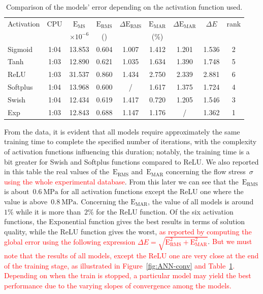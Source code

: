 \documentclass[algorithms,article,submit,pdftex,oneauthors]{Definitions/mdpi}
\DeclareRobustCommand{\MSE}{\text{E}_\text{MS}}
\DeclareRobustCommand{\RMSE}{\text{E}_\text{RMS}}
\DeclareRobustCommand{\MARE}{\text{E}_\text{MAR}}
\DeclareRobustCommand{\MPa}{\text{MPa}}
\begin{document}
\begin{table}[h!]
\caption{Comparison of the models' error depending on the activation function used.\label{tab:Training}}
\begin{tabular}{l|c|c|cc|cc|cc}
\toprule
Activation & CPU & $\MSE$ & $\RMSE$ & $\Delta\RMSE$ & $\MARE$ & $\Delta\MARE$ &  $\Delta E$ & rank \\
 & & $\times 10^{-6}$ & (\MPa) & & (\%) & & &\\ \midrule
Sigmoid & 1:04 & 13.853 & 0.604 & 1.007 & 1.412 & 1.201 & 1.536 & 2\\
Tanh & 1:03 & 12.890 & 0.621 & 1.035 & 1.634 & 1.390 & 1.748 & 5\\
ReLU & 1:03 & 31.537 & 0.860 & 1.434 & 2.750 & 2.339 & 2.881 & 6\\
Softplus & 1:04 & 13.968 & 0.600 & / & 1.617 & 1.375 & 1.724 & 4\\
Swish & 1:04 & 12.434 & 0.619 & 1.417 & 0.720 & 1.205 & 1.546 & 3\\
Exp & 1:03 & 12.843 & 0.688 & 1.147 & 1.176 & / & 1.362 & 1\\
\bottomrule
\end{tabular}
\end{table}

\textcolor{greencolor}{From the data, it is evident that all models require approximately the same training time to complete the specified number of iterations, with the complexity of activation functions influencing this duration; notably, the training time is a bit greater for Swish and Softplus functions compared to ReLU.}
We also reported in this table the real values of the~$\RMSE$ and~$\MARE$ concerning the flow stress~$\sigma$ \textcolor{red}{using the whole experimental database}.
From this later we can see that the~$\RMSE$ is about~$0.6~\MPa$ for all activation functions except the ReLU one where the value is above~$0.8~\MPa$.
Concerning the $\MARE$, the value of all models is around~$1\%$ while it is more than~$2\%$ for the ReLU function.
Of the six activation functions, the Exponential function gives the best results in terms of solution quality, while the ReLU function gives the worst, \textcolor{red}{as reported by computing the global error using the following expression $\Delta E=\sqrt{\RMSE^2+\MARE^2}$}.
\textcolor{red}{But we must note that the results of all models, except the ReLU one are very close at the end of the training stage, as illustrated in Figure~\ref{fig:ANN-conv} and Table~\ref{tab:Training}.
Depending on when the train is stopped, a particular model may yield the best performance due to the varying slopes of convergence among the models.}
\end{document}
